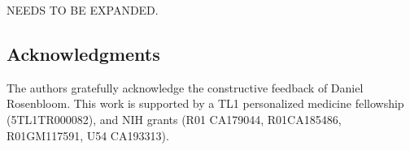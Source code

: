 \documentclass[a4paper,11pt]{article}
\begin{document}
NEEDS TO BE EXPANDED.



\subsection*{Acknowledgments}

The authors gratefully acknowledge the constructive feedback of Daniel Rosenbloom.
This work is supported by a TL1 personalized medicine fellowship (5TL1TR000082), and NIH grants (R01 CA179044, R01CA185486, R01GM117591, U54 CA193313).



\end{document}
